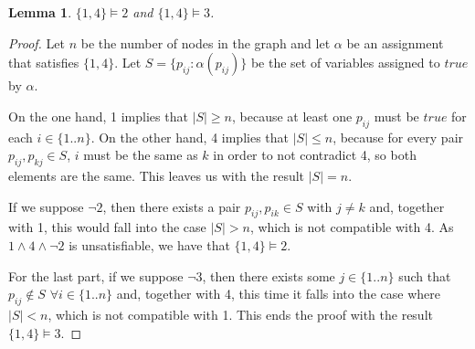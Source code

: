 \documentclass{article}
\newtheorem*{lemma}{Lemma}
\begin{document}
\begin{lemma}
  $\{1,4\} \models 2$ and $\{1,4\} \models 3$.
\end{lemma}

\begin{proof}
  Let $n$ be the number of nodes in the graph and let $\alpha$ be an 
  assignment that satisfies $\{1,4\}$. Let $S = \{ p_{i j} : \alpha(p_{i j}) \}$ 
  be the set of variables assigned to $true$ by $\alpha$.

  On the one hand, 1 implies that $|S| \geq n$, because at least one $p_{i j}$
  must be $true$ for each $i \in \{1..n\}$. On the other hand, 4 implies that $|S| \leq n$,
  because for every pair $p_{i j},p_{k j} \in S$, $i$ must be the same as $k$ in
  order to not contradict 4, so both elements are the same. This leaves us with
  the result  $|S| = n$.

  If we suppose $\neg 2$, then there exists a pair $p_{i j}, p_{i k} \in S$
  with $j \neq k$ and, together with 1, this would fall into the case $|S| > n$, 
  which is not compatible with 4. As $1 \land 4 \land \neg 2$ is unsatisfiable,
  we have that $\{1,4\} \models 2$.

  For the last part, if we suppose $\neg 3$, then there exists some $j \in \{1..n\}$ 
  such that $p_{i j} \notin S$ $\forall i \in \{1..n\}$ and, together with 4,
  this time it falls into the case where $|S| < n$, which is not compatible with 1. 
  This ends the proof with the result $\{1,4\} \models 3$.
\end{proof}
\end{document}
